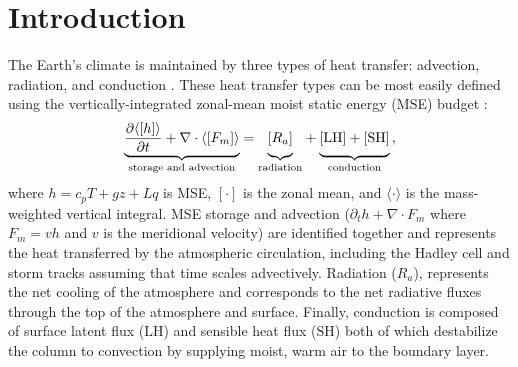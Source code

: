 \documentclass{ametsocV5}
\begin{document}




\section{Introduction}

The Earth's climate is maintained by three types of heat transfer: advection, radiation, and conduction \citep{hartmann2016}. These heat transfer types can be most easily defined using the vertically-integrated zonal-mean moist static energy (MSE) budget \citep{neelin1987}:
\begin{equation} \label{eq:mse}
    {\underbrace{\frac{\partial \langle [h] \rangle}{\partial t} + \nabla\cdot \langle [F_{m}]\rangle}_{\text{storage and advection}}} = {\underbrace{\vphantom{\frac{\partial \langle [h] \rangle}{\partial t}} [R_{a}]}_\text{radiation}} + {\underbrace{\vphantom{\frac{\partial \langle [h] \rangle}{\partial t}} \mathrm{[LH]+[SH]}}_\text{conduction}} \, ,
\end{equation}
where $h=c_p T + gz + Lq$ is MSE, $[\cdot]$ is the zonal mean, and $\langle \cdot \rangle$ is the mass-weighted vertical integral. MSE storage and advection ($\partial_t h+\nabla\cdot F_m$ where $F_m=vh$ and $v$ is the meridional velocity) are identified together and represents the heat transferred by the atmospheric circulation, including the Hadley cell and storm tracks assuming that time scales advectively. Radiation ($R_a$), represents the net cooling of the atmosphere and corresponds to the net radiative fluxes through the top of the atmosphere and surface. Finally, conduction is composed of surface latent flux ($\mathrm{LH}$) and sensible heat flux ($\mathrm{SH}$) both of which destabilize the column to convection by supplying moist, warm air to the boundary layer.
\end{document}
